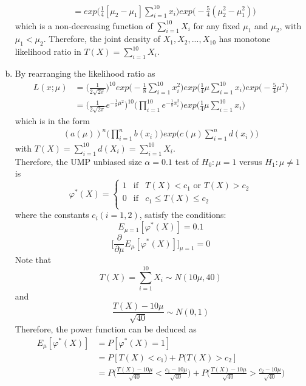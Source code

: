 \documentclass[a4paper,11pt]{article}
\begin{document}
\begin{enumerate}[(a)]
\begin{align*}
		&= exp\bigg(\frac{1}{4}[\mu_2-\mu_1]\sum^{10}_{i=1}x_i \bigg)exp\bigg(-\frac{5}{4}(\mu_2^2 - \mu_1^2)   \bigg)
		\end{align*}
		which is a non-decreasing function of $\sum^{10}_{i=1} X_i$ for any fixed $\mu_1$ and $\mu_2$, with $\mu_1 < \mu_2$. Therefore, the joint density of $X_1,X_2, ...,X_{10}$ has monotone likelihood ratio in $T(X) = \sum^{10}_{i=1} X_i$.
	\item
		By rearranging the likelihood ratio as
		\begin{align*}
		L(x;\mu)&= \bigg( \frac{1}{2\sqrt{2\pi}}  \bigg)^{10} exp\bigg(-\frac{1}{8}\sum^{10}_{i=1}x_i^2 \bigg)exp\bigg(\frac{1}{4}\mu\sum^{10}_{i=1}x_i   \bigg)exp\bigg(-\frac{5}{4}\mu^2   \bigg)\\
		&= \bigg( \frac{1}{2\sqrt{2\pi}}e^{-\frac{1}{8}\mu^2}  \bigg)^{10}\bigg(\prod^{10}_{i=1}e^{-\frac{1}{8}x_i^2} \bigg)exp\bigg(\frac{1}{4}\mu\sum^{10}_{i=1}x_i   \bigg)
		\end{align*}
		which is in the form
		\begin{align*}
		(a(\mu))^n\bigg( \prod^{n}_{i=1}b(x_i) \bigg)exp\bigg(c(\mu) \sum^n_{i=1}d(x_i)  \bigg)
		\end{align*}
		with $T(X) = \sum^{10}_{i=1}d(X_i) = \sum^{10}_{i=1} X_i$.\\
		Therefore, the UMP unbiased size $\alpha = 0.1$ test of $H_0:\mu=1$ versus $H_1:\mu \neq1$ is 
		\[
		\varphi^*(X)= \left\{ 
			\begin{array}{rcl}
			1 & \mbox{if}
			&  T(X)<c_1 \mbox{ or } T(X)>c_2 \\ 0 & \mbox{if} & c_1\le T(X) \le c_2 \\
			\end{array}\right.
		\]
	where the constants $c_i (i=1,2)$, satisfy the conditions:
		\begin{equation}\label{az1}	
			E_{\mu=1}[\varphi^*(X)] = 0.1
		\end{equation}
		\begin{equation}\label{az2}	
			\bigg[ \frac{\partial}{\partial\mu}E_{\mu}[\varphi^*(X)]\bigg]_{\mu=1} = 0
		\end{equation}
		Note that
		\[
		T(X) = \sum^{10}_{i=1}X_i \sim N(10\mu,40)
		\]
		and
		\[
		\frac{T(X)-10\mu}{\sqrt{40}} \sim N(0,1)
		\]
	Therefore, the power function can be deduced as
		\begin{align*}
			E_{\mu}[\varphi^*(X)]&= P[\varphi^*(X)=1]\\
			&=P[T(X)<c_1)+P(T(X)>c_2]\\
			&=P\bigg(\frac{T(X)-10\mu}{\sqrt{40}}<\frac{c_1-10\mu}{\sqrt{40}}\bigg)+P\bigg(\frac{T(X)-10\mu}{\sqrt{40}}>\frac{c_2-10\mu}{\sqrt{40}}\bigg)\\

\end{align*}
\end{enumerate}
\end{document}

